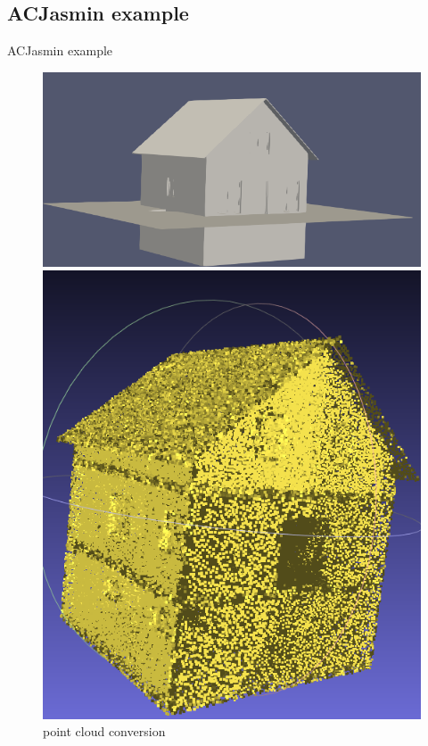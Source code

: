 \documentclass[10pt]{beamer}
\begin{document}
\subsection*{ACJasmin example}
\begin{frame}{ACJasmin example }
    \begin{figure}[H]
        \centering
        \begin{minipage}[t]{0.60\textwidth}
          \includegraphics[width=\textwidth]{../../images/screen_kinetic/ACJasmin.png}
          \caption*{ACJasmin}
        \end{minipage}
        \begin{minipage}[t]{0.35\textwidth}
            \includegraphics[width=\textwidth]{../../images/screen_kinetic/ACJasmin_point_cloud.png}
            \caption*{ACJasmin point clouds}
          \end{minipage}
          \caption{point cloud conversion}
      \end{figure}  
\end{frame}
\end{document}
